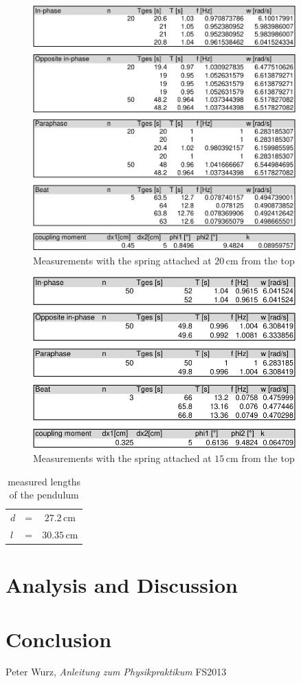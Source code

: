 \documentclass{scrreprt}
\newcommand{\unit}[1]{\ensuremath{\, \mathrm{#1}}}
\begin{document}
\begin{figure}[H]
	\centering
  \includegraphics[width=0.9\textwidth]{diag/readings20cm.pdf}
	\caption{Measurements with the spring attached at $20\unit{cm}$ from the top}
	\label{fig:20cm}
\end{figure}

\begin{figure}[H]
	\centering
  \includegraphics[width=0.9\textwidth]{diag/readings15cm.pdf}
	\caption{Measurements with the spring attached at $15\unit{cm}$ from the top}
	\label{fig:15cm}
\end{figure}
\begin{table}[H]
	\centering
	\begin{tabular}{|lcc|}
		\hline
		$d$&=&$27.2\unit{cm}$\\
		$l$&=&$30.35\unit{cm}$\\
		\hline
	\end{tabular}
	\caption{measured lengths of the pendulum}
\end{table}

\section{Analysis and Discussion}

\section{Conclusion}

\begin{thebibliography}{9}

  Peter Wurz,
  \emph{Anleitung zum Physikpraktikum}
  FS2013

\end{thebibliography}
\end{document}
